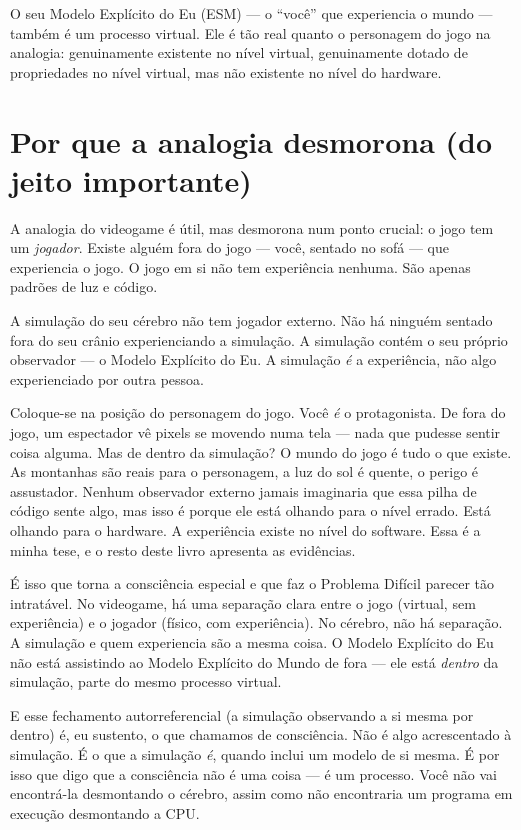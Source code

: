 \documentclass[11pt, twoside, openright]{book}
\begin{document}
O seu Modelo Explícito do Eu (ESM) --- o ``você'' que experiencia o mundo --- também é um processo virtual. Ele é tão real quanto o personagem do jogo na analogia: genuinamente existente no nível virtual, genuinamente dotado de propriedades no nível virtual, mas não existente no nível do hardware.

\section*{Por que a analogia desmorona (do jeito importante)}

A analogia do videogame é útil, mas desmorona num ponto crucial: o jogo tem um \textit{jogador}. Existe alguém fora do jogo --- você, sentado no sofá --- que experiencia o jogo. O jogo em si não tem experiência nenhuma. São apenas padrões de luz e código.

A simulação do seu cérebro não tem jogador externo. Não há ninguém sentado fora do seu crânio experienciando a simulação. A simulação contém o seu próprio observador --- o Modelo Explícito do Eu. A simulação \textit{é} a experiência, não algo experienciado por outra pessoa.

Coloque-se na posição do personagem do jogo. Você \textit{é} o protagonista. De fora do jogo, um espectador vê pixels se movendo numa tela --- nada que pudesse sentir coisa alguma. Mas de dentro da simulação? O mundo do jogo é tudo o que existe. As montanhas são reais para o personagem, a luz do sol é quente, o perigo é assustador. Nenhum observador externo jamais imaginaria que essa pilha de código sente algo, mas isso é porque ele está olhando para o nível errado. Está olhando para o hardware. A experiência existe no nível do software. Essa é a minha tese, e o resto deste livro apresenta as evidências.

É isso que torna a consciência especial e que faz o Problema Difícil parecer tão intratável. No videogame, há uma separação clara entre o jogo (virtual, sem experiência) e o jogador (físico, com experiência). No cérebro, não há separação. A simulação e quem experiencia são a mesma coisa. O Modelo Explícito do Eu não está assistindo ao Modelo Explícito do Mundo de fora --- ele está \textit{dentro} da simulação, parte do mesmo processo virtual.

E esse fechamento autorreferencial (a simulação observando a si mesma por dentro) é, eu sustento, o que chamamos de consciência. Não é algo acrescentado à simulação. É o que a simulação \textit{é}, quando inclui um modelo de si mesma. É por isso que digo que a consciência não é uma coisa --- é um processo. Você não vai encontrá-la desmontando o cérebro, assim como não encontraria um programa em execução desmontando a CPU.
\end{document}
